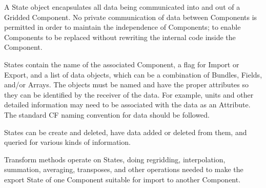 %


A State object encapsulates all data being communicated into and
out of a Gridded Component.  No private communication
of data between Components is permitted in order to maintain the
independence of Components; to enable Components to be replaced
without rewriting the internal code inside the Component.

States contain the name of the associated Component, a flag for Import
or Export, and a list of data objects, which can be a combination of
Bundles, Fields, and/or Arrays.  The objects must be named and have
the proper attributes so they can be identified by the receiver of
the data.  For example, units and other detailed information
may need to be associated with the data as an Attribute.  
The standard CF naming convention for data should be followed.

States can be create and deleted, have data added or deleted from them,
and queried for various kinds of information.

Transform methods operate on States, doing regridding, interpolation,
summation, averaging, transposes, and other operations needed to
make the export State of one Component suitable for import to another
Component.
